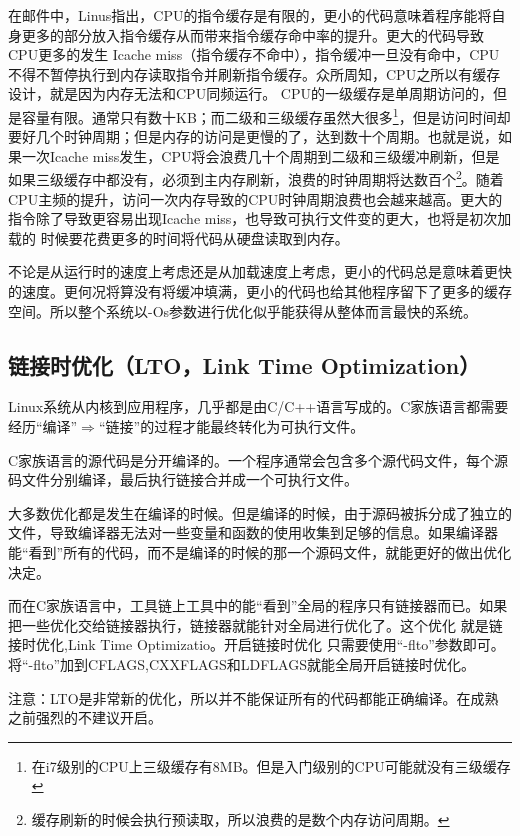 在邮件中，Linus指出，CPU的指令缓存是有限的，更小的代码意味着程序能将自身更多的部分放入指令缓存从而带来指令缓存命中率的提升。更大的代码导致CPU更多的发生 Icache miss（指令缓存不命中），指令缓冲一旦没有命中，CPU不得不暂停执行到内存读取指令并刷新指令缓存。众所周知，CPU之所以有缓存设计，就是因为内存无法和CPU同频运行。
CPU的一级缓存是单周期访问的，但是容量有限。通常只有数十KB；而二级和三级缓存虽然大很多\footnote{在i7级别的CPU上三级缓存有8MB。但是入门级别的CPU可能就没有三级缓存}，但是访问时间却要好几个时钟周期；但是内存的访问是更慢的了，达到数十个周期。也就是说，如果一次Icache miss发生，CPU将会浪费几十个周期到二级和三级缓冲刷新，但是如果三级缓存中都没有，必须到主内存刷新，浪费的时钟周期将达数百个\footnote{缓存刷新的时候会执行预读取，所以浪费的是数个内存访问周期。}。随着CPU主频的提升，访问一次内存导致的CPU时钟周期浪费也会越来越高。更大的指令除了导致更容易出现Icache miss，也导致可执行文件变的更大，也将是初次加载的
时候要花费更多的时间将代码从硬盘读取到内存。

不论是从运行时的速度上考虑还是从加载速度上考虑，更小的代码总是意味着更快的速度。更何况将算没有将缓冲填满，更小的代码也给其他程序留下了更多的缓存空间。所以整个系统以-Os参数进行优化似乎能获得从整体而言最快的系统。



\subsection{链接时优化（LTO，Link Time Optimization）}

Linux系统从内核到应用程序，几乎都是由C/C++语言写成的。C家族语言都需要经历“编译”$\Rightarrow$“链接”的过程才能最终转化为可执行文件。

C家族语言的源代码是分开编译的。一个程序通常会包含多个源代码文件，每个源码文件分别编译，最后执行链接合并成一个可执行文件。

大多数优化都是发生在编译的时候。但是编译的时候，由于源码被拆分成了独立的文件，导致编译器无法对一些变量和函数的使用收集到足够的信息。如果编译器能“看到”所有的代码，而不是编译的时候的那一个源码文件，就能更好的做出优化决定。

而在C家族语言中，工具链上工具中的能“看到”全局的程序只有链接器而已。如果把一些优化交给链接器执行，链接器就能针对全局进行优化了。这个优化 就是链接时优化,Link Time Optimizatio。开启链接时优化
只需要使用“-flto”参数即可。将“-flto”加到CFLAGS,CXXFLAGS和LDFLAGS就能全局开启链接时优化。

\begin{notice}
注意：LTO是非常新的优化，所以并不能保证所有的代码都能正确编译。在成熟之前强烈的不建议开启。
\end{notice}

